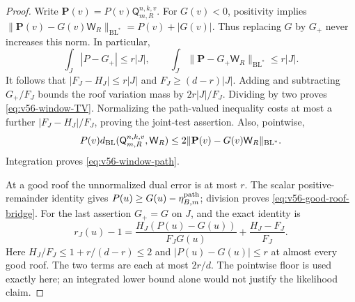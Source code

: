 \begin{proof}
Write $\mathbf P(v)=P(v)\mathsf Q^{n,k,v}_{m,R}$. For $G(v)<0$,
positivity implies
$\|\mathbf P(v)-G(v)\mathsf W_R\|_{\mathrm{BL}^*}=P(v)+|G(v)|$.
Thus replacing $G$ by $G_+$ never increases this norm. In particular,
\[
 \int_J|P-G_+|\le r|J|,\qquad
 \int_J\|\mathbf P-G_+\mathsf W_R\|_{\mathrm{BL}^*}\le r|J|.
\]
It follows that $|F_J-H_J|\le r|J|$ and $F_J\ge(d-r)|J|$.
Adding and subtracting $G_+/F_J$ bounds the roof variation mass
by $2r|J|/F_J$. Dividing by two proves
\eqref{eq:v56-window-TV}. Normalizing the path-valued inequality
costs at most a further $|F_J-H_J|/F_J$, proving the joint-test
assertion. Also, pointwise,
\[
 P(v)d_{\rm BL}(\mathsf Q^{n,k,v}_{m,R},\mathsf W_R)
       \le2\|\mathbf P(v)-G(v)\mathsf W_R\|_{\mathrm{BL}^*}.
\]
Integration proves \eqref{eq:v56-window-path}.

At a good roof the unnormalized dual error is at most $r$.
The scalar positive-remainder identity gives
$P(u)\ge G(u)-\eta^{\rm path}_{B,m}$; division proves
\eqref{eq:v56-good-roof-bridge}. For the last assertion $G_+=G$
on $J$, and the exact identity is
\[
 r_J(u)-1=\frac{H_J(P(u)-G(u))}{F_JG(u)}
                              +\frac{H_J-F_J}{F_J}.
\]
Here $H_J/F_J\le1+r/(d-r)\le2$ and $|P(u)-G(u)|\le r$ at
almost every good roof. The two terms are each at most $2r/d$.
The pointwise floor is used exactly here; an integrated lower bound
alone would not justify the likelihood claim.
\end{proof}

